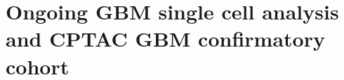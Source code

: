 \chapter{Ongoing GBM single cell analysis and CPTAC GBM confirmatory cohort}
\label{chap:gbm-single-cell}
